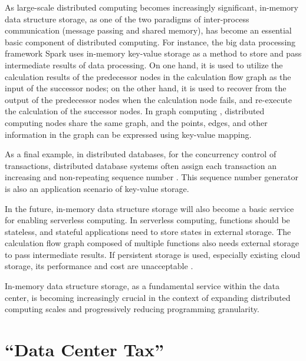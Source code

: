 As large-scale distributed computing becomes increasingly significant, in-memory data structure storage, as one of the two paradigms of inter-process communication (message passing and shared memory), has become an essential basic component of distributed computing.
For instance, the big data processing framework Spark uses in-memory key-value storage as a method to store and pass intermediate results of data processing. On one hand, it is used to utilize the calculation results of the predecessor nodes in the calculation flow graph as the input of the successor nodes; on the other hand, it is used to recover from the output of the predecessor nodes when the calculation node fails, and re-execute the calculation of the successor nodes.
In graph computing \cite{wu2015g,xiao17tux2}, distributed computing nodes share the same graph, and the points, edges, and other information in the graph can be expressed using key-value mapping.

As a final example, in distributed databases, for the concurrency control of transactions, distributed database systems often assign each transaction an increasing and non-repeating sequence number \cite{li2017eris}. This sequence number generator is also an application scenario of key-value storage.

In the future, in-memory data structure storage will also become a basic service for enabling serverless computing. In serverless computing, functions should be stateless, and stateful applications need to store states in external storage. The calculation flow graph composed of multiple functions also needs external storage to pass intermediate results. If persistent storage is used, especially existing cloud storage, its performance and cost are unacceptable \cite{jonas2019cloud}.

In-memory data structure storage, as a fundamental service within the data center, is becoming increasingly crucial in the context of expanding distributed computing scales and progressively reducing programming granularity.

\section{``Data Center Tax''}
\label{background:sec:datacenter-tax}

